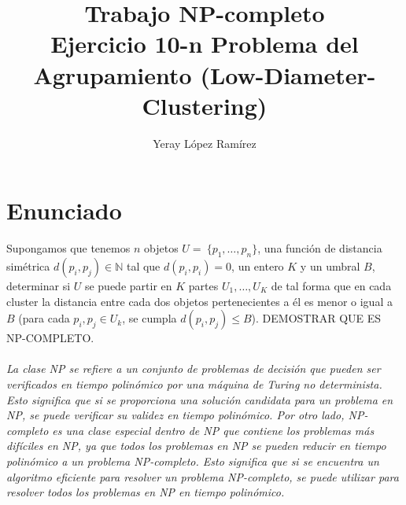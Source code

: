 

\title{
	Trabajo NP-completo \\\vspace{1cm}
	Ejercicio 10-n 
	Problema del Agrupamiento
	(Low-Diameter-Clustering)
 }   

\author{Yeray López Ramírez	}                             


\renewcommand*\contentsname{hola}

\makeatletter
\let\thetitle\@title
\let\theauthor\@author
\let\thedate\@date
\makeatother





\newpage %
\newcommand{\code}[1]{\colorbox{light-gray}{\textcolor{alizarin}{\texttt{#1}}}}
\newcommand{\high}[1]{\colorbox{light-gray}{\textcolor{nyellow}{\texttt{#1}}}}

\tableofcontents %

\newpage


\section{Enunciado}
Supongamos que tenemos $n$ objetos $U = \ \{p_1, \ldots, p_n\}$, una función de distancia simétrica $d(p_i, p_j) \in \mathbb{N}$ tal que $d(p_i, p_i) = 0$, un entero $K$ y un umbral $B$, determinar si $U$ se puede partir en $K$ partes $U_1, \ldots, U_K$ de tal forma que en cada cluster la distancia entre cada dos objetos pertenecientes a él es menor o igual a $B$ (para cada $p_i, p_j \in U_k$, se cumpla $d(p_i, p_j) \leq B$). DEMOSTRAR QUE ES NP-COMPLETO.
\\ \quad \\
\textit{La clase NP se refiere a un conjunto de problemas de decisión que pueden ser verificados en tiempo polinómico por una máquina de Turing no determinista. Esto significa que si se proporciona una solución candidata para un problema en NP, se puede verificar su validez en tiempo polinómico. Por otro lado, NP-completo es una clase especial dentro de NP que contiene los problemas más difíciles en NP, ya que todos los problemas en NP se pueden reducir en tiempo polinómico a un problema NP-completo. Esto significa que si se encuentra un algoritmo eficiente para resolver un problema NP-completo, se puede utilizar para resolver todos los problemas en NP en tiempo polinómico.
}

